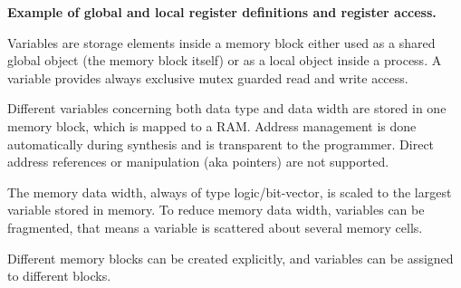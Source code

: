 \documentclass[a4paper,12pt,twoside,english]{article}
\begin{document}
\def\exdescription{\caption{\bf Example of global and local register definitions and register access.
}\label{example:3}}
\exampleBplain
\begin{example}[H]\let\normalsize\footnotesize \normalsize
\exdescription
\end{example}
\excontent



\def\thesubsubsection{\tocXVII}
\secIII{\label{toclabelXVII}\thesubsubsection}
Variables are storage elements inside a memory block either used as a shared global object (the
memory block itself) or as a local object inside a process. A variable provides always  exclusive mutex guarded read and write access. 


\vskip5pt
Different variables concerning both data type and data width are stored in one memory block, which is mapped to a RAM. Address management is done automatically
during synthesis and is transparent to the programmer. Direct address references or manipulation (aka pointers) are not supported. 


\vskip5pt
The memory data width, always of type logic/bit-vector, is scaled to the largest variable stored in memory. To reduce memory data width, variables can be
fragmented, that means a variable is scattered about several memory cells. 


\vskip5pt
Different memory blocks can be created explicitly, and variables can be assigned to different blocks.


\vskip5pt
\end{document}
